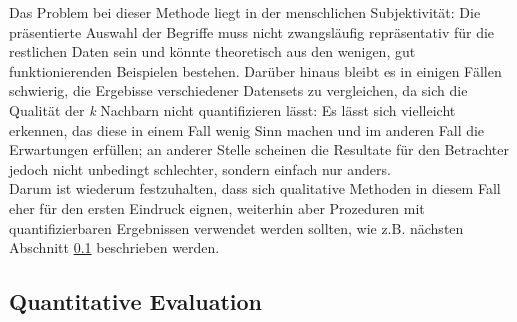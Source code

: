   Das Problem bei dieser Methode liegt in der menschlichen Subjektivität: Die präsentierte Auswahl der Begriffe
  muss nicht zwangsläufig repräsentativ für die restlichen Daten sein und könnte theoretisch aus den wenigen,
  gut funktionierenden Beispielen bestehen. Darüber hinaus bleibt es in einigen Fällen schwierig,
  die Ergebisse verschiedener Datensets zu vergleichen, da sich die Qualität der \emph{k} Nachbarn
  nicht quantifizieren lässt: Es lässt sich vielleicht erkennen, das diese in einem Fall wenig Sinn machen und
  im anderen Fall die Erwartungen erfüllen; an anderer Stelle scheinen die Resultate für den Betrachter jedoch nicht
  unbedingt schlechter, sondern einfach nur anders.\\
  Darum ist wiederum festzuhalten, dass sich qualitative Methoden in diesem Fall eher für den ersten Eindruck
  eignen, weiterhin aber Prozeduren mit quantifizierbaren Ergebnissen verwendet werden sollten, wie z.B.
  nächsten Abschnitt \ref{sec:quanteval} beschrieben werden.

  \subsection{Quantitative Evaluation}\label{sec:quanteval}

